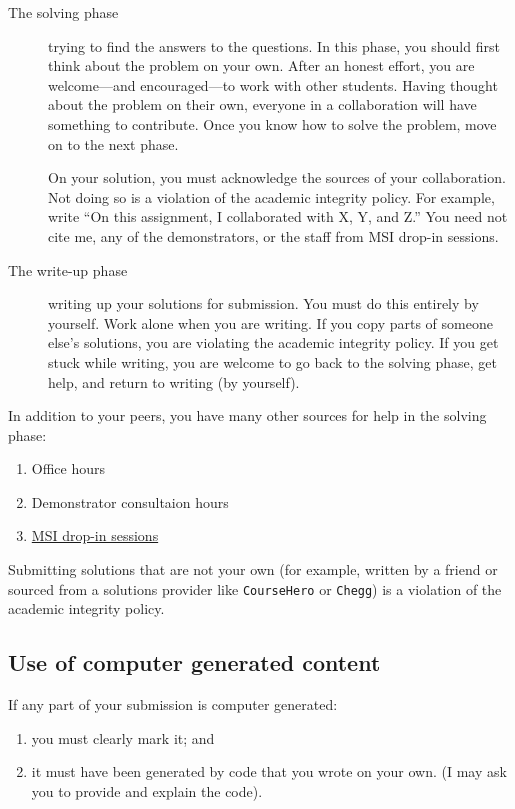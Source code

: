 \documentclass{amsart}
\begin{document}
\begin{description}
\item[{The solving phase}] trying to find the answers to the questions.
In this phase, you should first think about the problem on your own.  After an honest effort, you are welcome---and encouraged---to work with other students.  Having thought about the problem on their own, everyone in a collaboration will have something to contribute.  Once you know how to solve the problem, move on to the next phase.

On your solution, you must acknowledge the sources of your collaboration. 
Not doing so is a violation of the academic integrity policy.
For example, write ``On this assignment, I collaborated with X, Y, and Z.''
You need not cite me, any of the demonstrators, or the staff from MSI drop-in sessions.

\item[{The write-up phase}] writing up your solutions for submission.
You must do this entirely by yourself.  Work alone when you are writing.  If you copy parts of someone else's solutions, you are violating the academic integrity policy.  If you get stuck while writing, you are welcome to go back to the solving phase, get help, and return to writing (by yourself).
\end{description}

In addition to your peers, you have many other sources for help in the solving phase:
\begin{enumerate}
\item Office hours
\item Demonstrator consultaion hours
\item \href{https://maths.anu.edu.au/current-students/student-support}{MSI drop-in sessions}
\end{enumerate}

Submitting solutions that are not your own (for example, written by a friend or sourced from a solutions provider like \texttt{CourseHero} or \texttt{Chegg}) is a violation of the academic integrity policy.
\subsection*{Use of computer generated content}
\label{sec:orgfbc834b}
If any part of your submission is computer generated:
\begin{enumerate}
\item you must clearly mark it; and
\item it must have been generated by code that you wrote on your own.
(I may ask you to provide and explain the code).
\end{enumerate}
\end{document}
